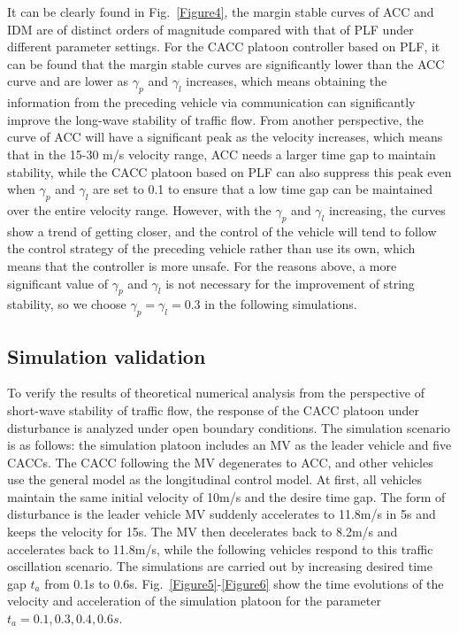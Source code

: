 \documentclass[journal]{IEEEtran}
\begin{document}
It can be clearly found in Fig.~\ref{Figure4}, the margin stable curves of ACC and IDM are of distinct orders of magnitude compared with that of PLF under different parameter settings. For the CACC platoon controller based on PLF, it can be found that the margin stable curves are significantly lower than the ACC curve and are lower as $\gamma_p$ and $\gamma_l$ increases, which means obtaining the information from the preceding vehicle via communication can significantly improve the long-wave stability of traffic flow. From another perspective, the curve of ACC will have a significant peak as the velocity increases, which means that in the 15-30 m/s velocity range, ACC needs a larger time gap to maintain stability, while the CACC platoon based on PLF can also suppress this peak even when $\gamma_p$ and $\gamma_l$ are set to 0.1 to ensure that a low time gap can be maintained over the entire velocity range. However, with the $\gamma_p$ and $\gamma_l$ increasing, the curves show a trend of getting closer, and the control of the vehicle will tend to follow the control strategy of the preceding vehicle rather than use its own, which means that the controller is more unsafe. For the reasons above, a more significant value of $\gamma_p$ and $\gamma_l$ is not necessary for the improvement of string stability, so we choose $\gamma_p=\gamma_l=0.3$ in the following simulations.

\subsection{Simulation validation}
\label{Section 5.2}
To verify the results of theoretical numerical analysis from the perspective of short-wave stability of traffic flow, the response of the CACC platoon under disturbance is analyzed under open boundary conditions. The simulation scenario is as follows: the simulation platoon includes an MV as the leader vehicle and five CACCs. The CACC following the MV degenerates to ACC, and other vehicles use the general model as the longitudinal control model. At first, all vehicles maintain the same initial velocity of 10m/s and the desire time gap. The form of disturbance is the leader vehicle MV suddenly accelerates to 11.8m/s in 5s and keeps the velocity for 15s. The MV then decelerates back to 8.2m/s and accelerates back to 11.8m/s, while the following vehicles respond to this traffic oscillation scenario. The simulations are carried out by increasing desired time gap $t_a$ from 0.1s to 0.6s. Fig.~\ref{Figure5}-\ref{Figure6} show the time evolutions of the velocity and acceleration of the simulation platoon for the parameter $t_a=0.1,0.3,0.4,0.6s$.
\end{document}
